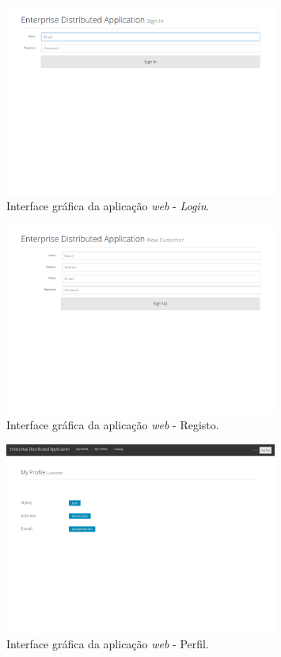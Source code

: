\documentclass[12pt]{article}
\begin{document}
\begin{figure}[H]
    \centering
    \includegraphics[width=0.8\textwidth]{Web_Login.png}
    \caption{Interface gráfica da aplicação \textit{web} - \textit{Login}.}
    \label{fig:c7}
\end{figure}

\begin{figure}[H]
    \centering
    \includegraphics[width=0.8\textwidth]{Web_Register.png}
    \caption{Interface gráfica da aplicação \textit{web} - Registo.}
    \label{fig:c8}
\end{figure}

\begin{figure}[H]
    \centering
    \includegraphics[width=0.8\textwidth]{Web_Profile.png}
    \caption{Interface gráfica da aplicação \textit{web} - Perfil.}
    \label{fig:c9}
\end{figure}
\end{document}
